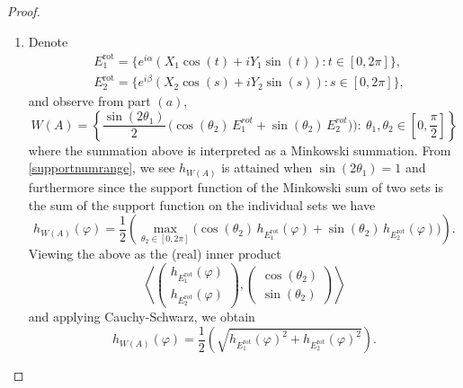 \documentclass[10pt,a4paper]{amsart}
\renewcommand{\phi}{\varphi}
\begin{document}
\begin{proof}
\begin{enumerate}
Furthermore a direct computation shows $\langle A\tilde{h},\tilde{h}\rangle$ is given by
\[
\begin{aligned}
& \cos (\theta_1) \,\sin (\theta_1) \Big(
\cos (\theta_2) \,(a_{12} e^{i\phi_2} + a_{21} e^{-i\phi_2}) 
+ \sin (\theta_2) \,(a_{13} e^{i\phi_3} + a_{31} e^{-i\phi_3}) 
\Big)\\
&+ \sin^2\theta_1 \,\cos (\theta_2) \,\sin (\theta_2) \,(a_{23} e^{i(\phi_3-\phi_2)} + a_{32} e^{i(\phi_2-\phi_3)})\\
&= \cos (\theta_1) \,\sin (\theta_1) \,\Big(
\cos (\theta_2) \, J_{{a_{12}},a_{21}}(e^{i\phi_2}) + \sin (\theta_2) \, J_{a_{13},a_{31}}(e^{i\phi_3})
\Big)
\\
&+ \sin^2\theta_1 \, \cos (\theta_2) \, \sin (\theta_2) \, J_{a_{23},a_{32}}(e^{i(\phi_3-\phi_2)}),
\end{aligned}
\]
from which \eqref{finalJ3by3} follows.


\item Denote
\[
\begin{aligned}
    &E_1^{\text{rot}} = \{ e^{i\alpha} (X_1  \cos (t) + i Y_1  \sin (t)) : t \in [0,2\pi] \}, \\
    &E_2^{\text{rot}} = \{ e^{i\beta} (X_2 \cos (s) + i Y_2 \sin (s)) : s \in [0,2\pi] \},
\end{aligned}
\]
and observe from part $(a)$,
\begin{equation}\label{supportnumrange}
    W(A) = \left\{ \frac{\sin( 2 \theta_1)}{2} \,\Big(
\cos(\theta_2) \, E_{1}^{rot} + \sin(\theta_2) \, E_{2}^{rot})
\Big) :  \ \theta_1, \theta_2 \in \left[0, \frac{\pi}{2}\right] \right\}
\end{equation}
where the summation above is interpreted as a Minkowski summation.
From \eqref{supportnumrange}, we see $h_{W(A)} $ is attained when $\sin (2 \theta_1) = 1$ and furthermore since the support function of the Minkowski sum of two sets is the sum of the support function on the individual sets we have
\[
h_{W(A)}(\phi) = \frac{1}{2} \left(\max_{\theta_2 \in [0, 2 \pi]} \big( \cos(\theta_2) \, h_{E_1^{\text{rot}}}(\phi) + \sin( \theta_2)\, h_{E_2^{\text{rot}}}(\phi) \big) \right).
\]
Viewing the above as the (real) inner product  $$\left\langle \begin{pmatrix}
    h_{E_1^{\text{rot}}}(\phi) \\
    h_{E_2^{\text{rot}}}(\phi)
\end{pmatrix},  \begin{pmatrix}
    \cos( \theta_2) \\
    \sin( \theta_2)
\end{pmatrix} \right\rangle
$$
and applying Cauchy-Schwarz, we obtain
\begin{equation}\label{support2}
h_{W(A)}(\phi)=\frac{1}{2} \left( \sqrt{ h_{E_1^{\text{rot}}}(\phi)^2 + h_{E_2^{\text{rot}}}(\phi)^2 } \right).
\end{equation}






\end{enumerate}
\end{proof}
\end{document}
